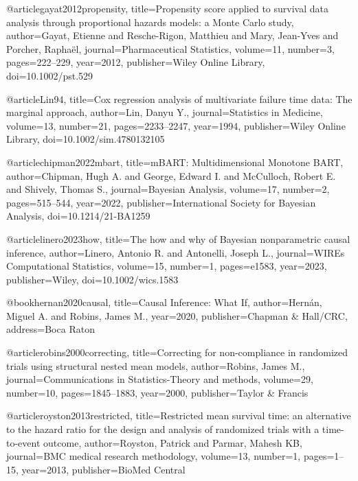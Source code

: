 @article{gayat2012propensity,
  title={Propensity score applied to survival data analysis through proportional hazards models: a Monte Carlo study},
  author={Gayat, Etienne and Resche-Rigon, Matthieu and Mary, Jean-Yves and Porcher, Raphaël},
  journal={Pharmaceutical Statistics},
  volume={11},
  number={3},
  pages={222--229},
  year={2012},
  publisher={Wiley Online Library},
  doi={10.1002/pst.529}
}

@article{Lin94,
  title={Cox regression analysis of multivariate failure time data: The marginal approach},
  author={Lin, Danyu Y.},
  journal={Statistics in Medicine},
  volume={13},
  number={21},
  pages={2233--2247},
  year={1994},
  publisher={Wiley Online Library},
  doi={10.1002/sim.4780132105}
}

@article{chipman2022mbart,
  title={mBART: Multidimensional Monotone BART},
  author={Chipman, Hugh A. and George, Edward I. and McCulloch, Robert E. and Shively, Thomas S.},
  journal={Bayesian Analysis},
  volume={17},
  number={2},
  pages={515--544},
  year={2022},
  publisher={International Society for Bayesian Analysis},
  doi={10.1214/21-BA1259}
}



@article{linero2023how,
  title={The how and why of Bayesian nonparametric causal inference},
  author={Linero, Antonio R. and Antonelli, Joseph L.},
  journal={WIREs Computational Statistics},
  volume={15},
  number={1},
  pages={e1583},
  year={2023},
  publisher={Wiley},
  doi={10.1002/wics.1583}
}














@book{hernan2020causal,
  title={Causal Inference: What If},
  author={Hern{\'a}n, Miguel A. and Robins, James M.},
  year={2020},
  publisher={Chapman \& Hall/CRC},
  address={Boca Raton}
}

@article{robins2000correcting,
  title={Correcting for non-compliance in randomized trials using structural nested mean models},
  author={Robins, James M.},
  journal={Communications in Statistics-Theory and methods},
  volume={29},
  number={10},
  pages={1845--1883},
  year={2000},
  publisher={Taylor \& Francis}
}



@article{royston2013restricted,
  title={Restricted mean survival time: an alternative to the hazard ratio for the design and analysis of randomized trials with a time-to-event outcome},
  author={Royston, Patrick and Parmar, Mahesh KB},
  journal={BMC medical research methodology},
  volume={13},
  number={1},
  pages={1--15},
  year={2013},
  publisher={BioMed Central}
}

